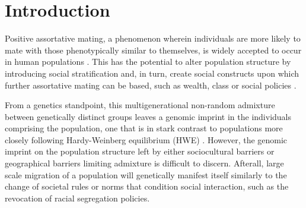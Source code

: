 \documentclass[11pt]{article}
\begin{document}
\newpage
\tableofcontents
\thispagestyle{empty}
\newpage
\linenumbers






\setcounter{page}{3}
\section{Introduction}





Positive assortative mating, a phenomenon wherein individuals are more likely to mate with those phenotypically similar to themselves, is widely accepted to occur in human populations \parencite{Norris2019}. This has the potential to alter population structure by introducing social stratification and, in turn, create social constructs upon which further assortative mating can be based, such as wealth, class or social policies \parencite{Risch2009}.

From a genetics standpoint, this multigenerational non-random admixture between genetically distinct groups leaves a genomic imprint in the individuals comprising the population, one that is in stark contrast to populations more closely following Hardy-Weinberg equilibrium (HWE) \parencite{Zaitlen2017}. However, the genomic imprint on the population structure left by either sociocultural barriers or geographical barriers limiting admixture is difficult to discern. Afterall, large scale migration of a population will genetically manifest itself similarly to the change of societal rules or norms that condition social interaction, such as the revocation of racial segregation policies. 
\end{document}
